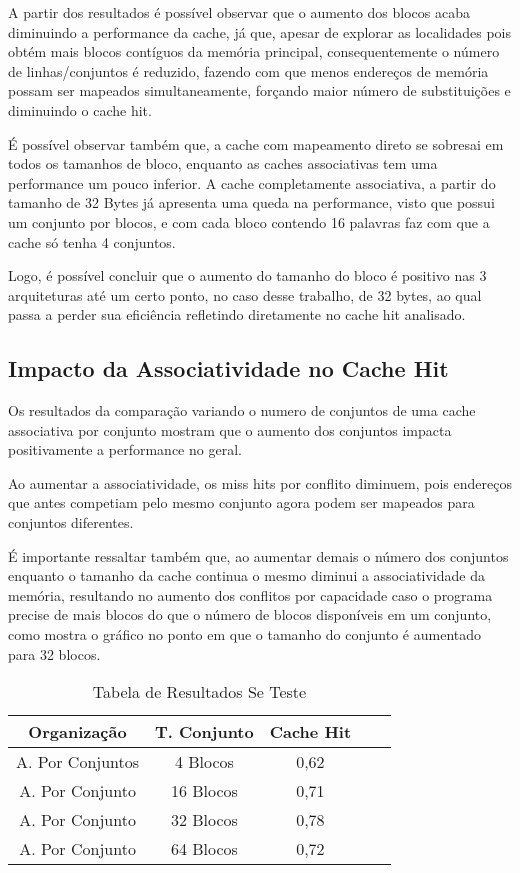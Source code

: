 \documentclass[conference]{IEEEtran}
\begin{document}
A partir dos resultados é possível observar que o aumento dos blocos acaba diminuindo a performance da cache, já que, apesar de explorar as localidades pois obtém mais blocos contíguos da memória principal, consequentemente o número de linhas/conjuntos é reduzido, fazendo com que menos endereços de memória possam ser mapeados simultaneamente, forçando maior número de substituições e diminuindo o cache hit.

É possível observar também que, a cache com mapeamento direto se sobresai em todos os tamanhos de bloco, enquanto as caches associativas tem uma performance um pouco inferior. A cache completamente associativa, a partir do tamanho de 32 Bytes já apresenta uma queda na performance, visto que possui um conjunto por blocos, e com cada bloco contendo 16 palavras faz com que a cache só tenha 
4 conjuntos.

Logo, é possível concluir que o aumento do tamanho do bloco é positivo nas 3 arquiteturas até um certo ponto, no caso desse trabalho, de 32 bytes, ao qual passa a perder sua eficiência refletindo diretamente no cache hit analisado.

\subsection{Impacto da Associatividade no Cache Hit}
Os resultados da comparação variando o numero de conjuntos de uma cache associativa por conjunto mostram que o aumento dos conjuntos impacta positivamente a performance no geral.

Ao aumentar a associatividade, os miss hits por conflito diminuem, pois endereços que antes competiam pelo mesmo conjunto agora podem ser mapeados para conjuntos diferentes.

É importante ressaltar também que, ao aumentar demais o número dos conjuntos enquanto o tamanho da cache continua o mesmo diminui a associatividade da memória, resultando no aumento dos conflitos por capacidade caso o programa precise de mais blocos do que o número de blocos disponíveis em um conjunto, como mostra o gráfico no ponto em que o tamanho do conjunto é aumentado para 32 blocos.

\begin{table}[h!]
\centering
\renewcommand{\arraystretch}{1.5}
\setlength{\tabcolsep}{5pt}
\begin{tabular}{|c|c|c|c|c|}
\hline
\textbf{Organização} & \textbf{T. Conjunto} & \textbf{Cache Hit} \\ \hline
A. Por Conjuntos         & 4 Blocos                 & 0,62            \\ \hline
A. Por Conjunto          & 16 Blocos                & 0,71            \\ \hline
A. Por Conjunto          & 32 Blocos               & 0,78            \\ \hline
A. Por Conjunto          & 64 Blocos                & 0,72            \\ \hline
\hline
\end{tabular}
\caption{Tabela de Resultados Se Teste}
\label{tab:media_final}
\end{table}
\end{document}
